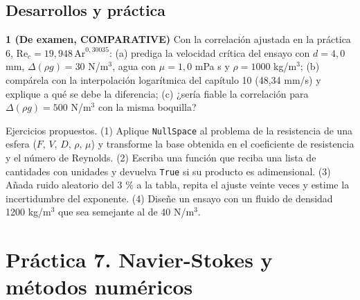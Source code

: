 \documentclass[10pt,openany]{book}
\begin{document}
\section{Desarrollos y práctica}

\begin{tcolorbox}[title={Ejercicios propuestos}, studiumworked, breakable]

\noindent\textbf{1 (De examen, COMPARATIVE)}
Con la correlación ajustada en la práctica 6, \(\mathrm{Re}_c = 19{,}948\,\mathrm{Ar}^{0{,}30035}\): (a) prediga la velocidad crítica del ensayo con \(d = 4{,}0\) mm, \(\Delta(\rho g) = 30\) N/m\(^3\), agua con \(\mu = 1{,}0\) mPa s y \(\rho = 1000\) kg/m\(^3\); (b) compárela con la interpolación logarítmica del capítulo 10 (48,34 mm/s) y explique a qué se debe la diferencia; (c) ¿sería fiable la correlación para \(\Delta(\rho g) = 500\) N/m\(^3\) con la misma boquilla?
\end{tcolorbox}

\begin{tcolorbox}[title={Autoevaluación}, studiumcheck, breakable]

Ejercicios propuestos. (1) Aplique \texttt{NullSpace} al problema de la resistencia de una esfera (\(F\), \(V\), \(D\), \(\rho\), \(\mu\)) y transforme la base obtenida en el coeficiente de resistencia y el número de Reynolds. (2) Escriba una función que reciba una lista de cantidades con unidades y devuelva \texttt{True} si su producto es adimensional. (3) Añada ruido aleatorio del 3 \% a la tabla, repita el ajuste veinte veces y estime la incertidumbre del exponente. (4) Diseñe un ensayo con un fluido de densidad 1200 kg/m\(^3\) que sea semejante al de 40 N/m\(^3\).
\end{tcolorbox}
\studiumchaptercheck

\chapter{Práctica 7. Navier-Stokes y métodos numéricos}
\label{chap:m07}

\end{document}
